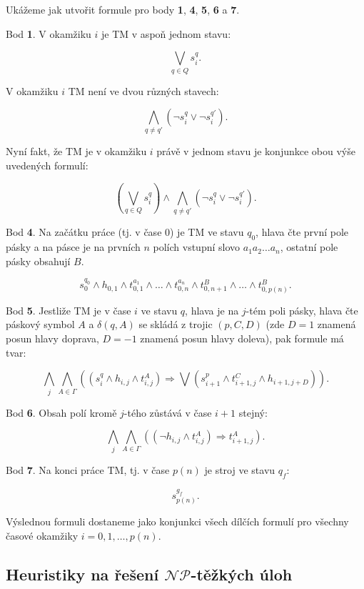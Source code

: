 \noindent Ukážeme jak utvořit formule pro body \textbf{1}, \textbf{4}, \textbf{5}, \textbf{6} a \textbf{7}.

Bod \textbf{1}. V okamžiku $i$ je TM v aspoň jednom stavu:

    $$\bigvee \limits_{q \in Q} s^{q}_{i}.$$
    
V okamžiku $i$ TM není ve dvou různých stavech:

    $$\bigwedge \limits_{q \neq q'} (\neg s^{q}_{i} \vee \neg s^{q'}_{i}).$$
    
Nyní fakt, že TM je v okamžiku $i$ právě v jednom stavu je konjunkce obou výše uvedených formulí:

    $$ (\bigvee \limits_{q \in Q} s^{q}_{i}) \wedge \bigwedge \limits_{q \neq q'} (\neg s^{q}_{i} \vee \neg s^{q'}_{i}).$$

Bod \textbf{4}. Na začátku práce (tj. v čase 0) je TM ve stavu $q_0$, hlava čte první pole pásky a na pásce je na prvních $n$ polích vstupní slovo $a_1 a_2\hdots a_n$, ostatní pole pásky obsahují $B$.

    $$s^{q_0}_{0} \wedge h_{0,1} \wedge t^{a_1}_{0,1} \wedge \hdots \wedge t^{a_n}_{0,n} \wedge t^{B}_{0,n + 1} \wedge \hdots \wedge t^{B}_{0,p(n)}.$$
    
Bod \textbf{5}. Jestliže TM je v čase $i$ ve stavu $q$, hlava je na $j$-tém poli pásky, hlava čte páskový symbol $A$ a $\delta (q, A)$ se skládá z trojic $(p, C, D)$ (zde $D = 1$ znamená posun hlavy doprava, $D = -1$ znamená posun hlavy doleva), pak formule má tvar:

    $$\bigwedge \limits_{j} \bigwedge \limits_{A \in \Gamma} ( (s^{q}_{i} \wedge h_{i,j} \wedge t^{A}_{i,j}) \Rightarrow \bigvee (s^{p}_{i+1} \wedge t^{C}_{i+1,j} \wedge h_{i+1,j+D}) ).$$
    
Bod \textbf{6}. Obsah polí kromě $j$-tého zůstává v čase $i + 1$ stejný:

    $$\bigwedge \limits_{j} \bigwedge \limits_{A \in \Gamma} ((\neg h_{i,j} \wedge t^{A}_{i,j}) \Rightarrow t^{A}_{i+1,j}).$$
    
Bod \textbf{7}. Na konci práce TM, tj. v čase $p(n)$ je stroj ve stavu $q_f$:

    $$s^{g_f}_{p(n)}.$$
    
Výslednou formuli dostaneme jako konjunkci všech dílčích formulí pro všechny časové okamžiky $i = 0, 1, \hdots , p(n)$.

\subsection*{Heuristiky na řešení $\mathcal{NP}$-těžkých úloh}

